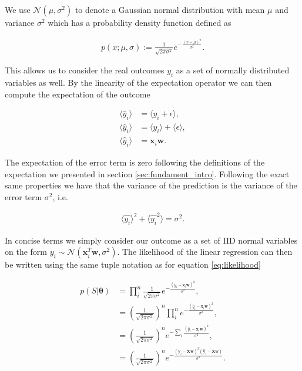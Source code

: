 \noindent We use $\mathcal{N}(\mu, \sigma^2)$ to denote a Gaussian normal distribution with mean $\mu$ and variance $\sigma^2$ which has a probability density function defined as 

\begin{align}
p(x ; \mu, \sigma) := \frac{1}{\sqrt{2\pi \sigma^2}}e^{-\frac{(x - \mu)^2}{\sigma^2}}.
\end{align}

\noindent This allows us to consider the real outcomes $y_i$ as a set of normally distributed variables as well. By the linearity of the expectation operator we can then compute the expectation of the outcome 

\begin{align}
\langle \hat{y}_i \rangle &= \langle y_i + \epsilon \rangle,  \\
\langle \hat{y}_i\rangle &= \langle y_i \rangle + \langle \epsilon \rangle, \\
\langle \hat{y}_i \rangle &= \mathbf{x}_i\mathbf{w}.
\end{align}

\noindent The expectation of the error term is zero following the definitions of the expectation we presented in section \ref{sec:fundament_intro}. Following the exact same properties we have that the variance of the prediction is the variance of the error term $\sigma^2$, i.e. 

\begin{align}
\langle \hat{y_i}\rangle^2 + \langle \hat{y_i}^2\rangle = \sigma^2.
\end{align}

\noindent In concise terms we simply consider our outcome as a set of IID normal variables on the form $y_i \sim \mathcal{N}(\mathbf{x}_i^T\mathbf{w}, \sigma^2)$. The likelihood of the linear regression can then be written using the same tuple notation as for equation \ref{eq:likelihood}

\begin{align}
p(S|\mathbf{\theta}) 
&= \prod_i^n \frac{1}{\sqrt{2\pi \sigma^2}}e^{-\frac{(\hat{y}_i - \mathbf{x}_i\mathbf{w})^2}{\sigma^2}}, \\
&= \left(\frac{1}{\sqrt{2\pi \sigma^2}} \right)^n \prod_i^n e^{-\frac{(\hat{y}_i - \mathbf{x}_i\mathbf{w})^2}{\sigma^2}}, \\
&= \left(\frac{1}{\sqrt{2\pi \sigma^2}} \right)^n  e^{-\sum_i\frac{(\hat{y}_i - \mathbf{x}_i\mathbf{w})^2}{\sigma^2}}, \\
&= \left(\frac{1}{\sqrt{2\pi \sigma^2}} \right)^n  e^{-\frac{(\mathbf{\hat{y}}_i - \mathbf{X}\mathbf{w})^T(\mathbf{\hat{y}}_i - \mathbf{X}\mathbf{w})}{\sigma^2}} .
\end{align}

